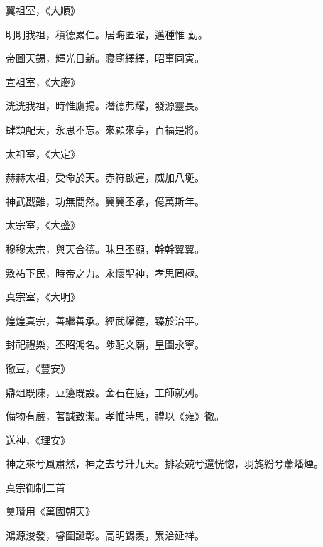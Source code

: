 \begin{pinyinscope}
 翼祖室，《大順》



 明明我祖，積德累仁。居晦匿曜，邁種惟
 勤。



 帝圖天錫，輝光日新。寢廟繹繹，昭事同寅。



 宣祖室，《大慶》



 洸洸我祖，時惟鷹揚。潛德弗耀，發源靈長。



 肆類配天，永思不忘。來顧來享，百福是將。



 太祖室，《大定》



 赫赫太祖，受命於天。赤符啟運，威加八埏。



 神武戡難，功無間然。翼翼丕承，億萬斯年。



 太宗室，《大盛》



 穆穆太宗，與天合德。昧旦丕顯，幹幹翼翼。



 敷祐下民，時帝之力。永懷聖神，孝思罔極。



 真宗室，《大明》



 煌煌真宗，善繼善承。經武耀德，臻於治平。



 封祀禮樂，丕昭鴻名。陟配文廟，皇圖永寧。



 徹豆，《豐安》



 鼎俎既陳，豆籩既設。金石在庭，工師就列。



 備物有嚴，著誠致潔。孝惟時思，禮以《雍》徹。



 送神，《理安》



 神之來兮風肅然，神之去兮升九天。排凌兢兮還恍惚，羽旄紛兮蕭燔煙。



 真宗御制二首



 奠瓚用《萬國朝天》



 鴻源浚發，睿圖誕彰。高明錫羨，累洽延祥。




\end{pinyinscope}
